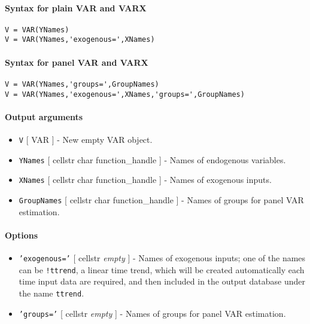 


	\paragraph{Syntax for plain VAR and
VARX}

\begin{verbatim}
V = VAR(YNames)
V = VAR(YNames,'exogenous=',XNames)
\end{verbatim}

\paragraph{Syntax for panel VAR and
VARX}

\begin{verbatim}
V = VAR(YNames,'groups=',GroupNames)
V = VAR(YNames,'exogenous=',XNames,'groups=',GroupNames)
\end{verbatim}

\paragraph{Output arguments}

\begin{itemize}
\item
  \texttt{V} {[} VAR {]} - New empty VAR object.
\item
  \texttt{YNames} {[} cellstr \textbar{} char \textbar{}
  function\_handle {]} - Names of endogenous variables.
\item
  \texttt{XNames} {[} cellstr \textbar{} char \textbar{}
  function\_handle {]} - Names of exogenous inputs.
\item
  \texttt{GroupNames} {[} cellstr \textbar{} char \textbar{}
  function\_handle {]} - Names of groups for panel VAR estimation.
\end{itemize}

\paragraph{Options}

\begin{itemize}
\item
  \texttt{'exogenous='} {[} cellstr \textbar{} \emph{empty} {]} - Names
  of exogenous inputs; one of the names can be \texttt{!ttrend}, a
  linear time trend, which will be created automatically each time input
  data are required, and then included in the output database under the
  name \texttt{ttrend}.
\item
  \texttt{'groups='} {[} cellstr \textbar{} \emph{empty} {]} - Names of
  groups for panel VAR estimation.
\end{itemize}

